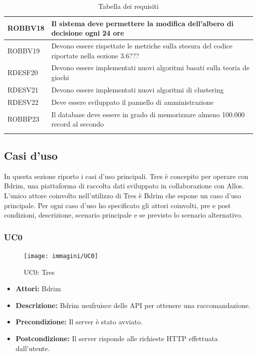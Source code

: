\begin{longtable}{|l|p{7cm}|}
ROBBV18	&	Il sistema deve permettere la modifica dell'albero di decisione ogni 24 ore	\\\hline
ROBBV19	&	Devono essere rispettate le metriche sulla stesura del codice riportate nella sezione 3.6??? \\\hline
RDESF20	&	Devono essere implementati nuovi algoritmi basati sulla teoria de giochi	\\\hline
RDESV21	&	Devono essere implementati nuovi algoritmi di clustering	\\\hline
RDESV22	&	Deve essere sviluppato il pannello di amministrazione	\\\hline
ROBBP23	&	Il database deve essere in grado di memorizzare almeno 100.000 record al secondo	\\\hline
\caption{Tabella dei requisiti}
\end{longtable}
\subsection{Casi d'uso}
In questa sezione riporto i casi d'uso principali. Tres è concepito per operare con Bdrim, una piattaforma di raccolta dati sviluppato in collaborazione con Allos. L'unico attore coinvolto nell'utilizzo di Tres è Bdrim che espone un caso d'uso principale. Per ogni caso d'uso ho specificato gli attori coinvolti, pre e post condizioni, descrizione, scenario principale e se previsto lo scenario alternativo. 
\subsubsection{UC0}
\begin{figure}[h]
\centering
\texttt{[image: immagini/UC0]}
\caption{UC0: Tres}
\label{fig:UC0}
\end{figure}
\begin{itemize}
\item \textbf{Attori:} Bdrim
\item \textbf{Descrizione:} Bdrim usufruisce delle API per ottenere una raccomandazione.
\item \textbf{Precondizione:} Il server è stato avviato.
\item \textbf{Postcondizione:} Il server risponde alle richieste HTTP effettuata dall'utente.
\end{itemize}
